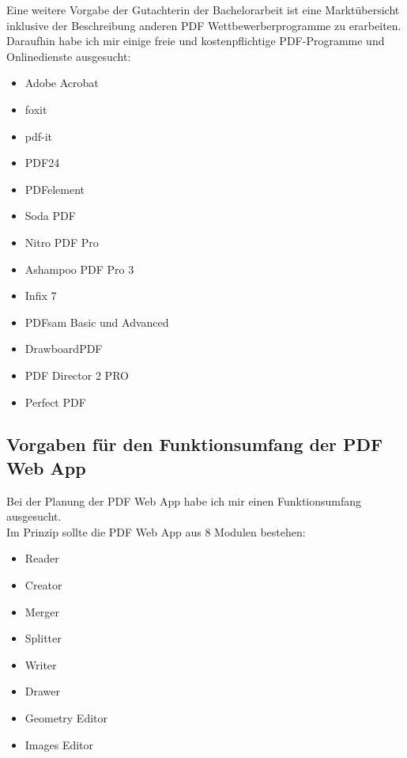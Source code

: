 Eine weitere Vorgabe der Gutachterin der Bachelorarbeit ist eine Marktübersicht inklusive der Beschreibung anderen PDF Wettbewerberprogramme zu erarbeiten. \\

Daraufhin habe ich mir einige freie und kostenpflichtige PDF-Programme und Onlinedienste ausgesucht: 

\begin{itemize}
	\item Adobe Acrobat
	\item foxit
	\item pdf-it
	\item PDF24
	\item PDFelement
	\item Soda PDF
	\item Nitro PDF Pro 
	\item Ashampoo PDF Pro 3
	\item Infix 7
	\item PDFsam Basic und Advanced
	\item DrawboardPDF
	\item PDF Director 2 PRO
	\item Perfect PDF
\end{itemize}


\subsection{Vorgaben für den Funktionsumfang der PDF Web App}
Bei der Planung der PDF Web App habe ich mir einen Funktionsumfang ausgesucht.\\
Im Prinzip sollte die PDF Web App aus 8 Modulen bestehen:
\begin{itemize}
	\item Reader
	\item Creator
	\item Merger
	\item Splitter
	\item Writer
	\item Drawer
	\item Geometry Editor
	\item Images Editor
\end{itemize}

